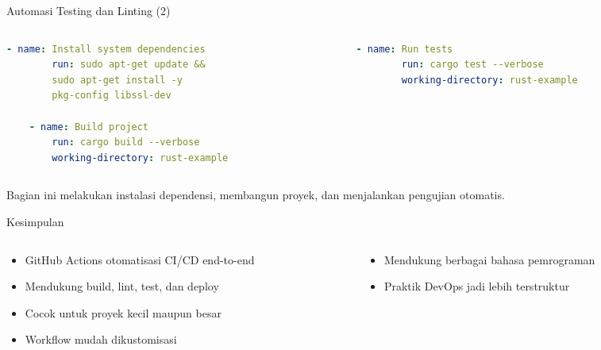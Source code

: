 \documentclass[aspectratio=169, table]{beamer}
\begin{document}
\begin{frame}[fragile]{Automasi Testing dan Linting (2)}
\vspace{10pt}
\begin{columns}[T]
\begin{column}{0.5\textwidth}
\begin{lstlisting}[language=yaml, firstnumber=21]
	- name: Install system dependencies
		run: sudo apt-get update &&
		sudo apt-get install -y
		pkg-config libssl-dev
	
	- name: Build project
		run: cargo build --verbose
		working-directory: rust-example
\end{lstlisting}
\end{column}

\begin{column}{0.5\textwidth}
\begin{lstlisting}[language=yaml, firstnumber=29]
	- name: Run tests
		run: cargo test --verbose
		working-directory: rust-example
\end{lstlisting}
\end{column}
\end{columns}

\vspace{6pt}
Bagian ini melakukan instalasi dependensi, membangun proyek, dan menjalankan pengujian otomatis.
\end{frame}

\begin{frame}[fragile]{Kesimpulan}
	\vspace{20pt}
	
	\begin{columns}[T]
		\begin{column}{0.5\textwidth}
			\begin{itemize}
				\item GitHub Actions otomatisasi CI/CD end-to-end
				\item Mendukung build, lint, test, dan deploy
				\item Cocok untuk proyek kecil maupun besar
				\item Workflow mudah dikustomisasi
			\end{itemize}
		\end{column}
		
		\begin{column}{0.5\textwidth}
			\begin{itemize}
				\item Mendukung berbagai bahasa pemrograman
				\item Praktik DevOps jadi lebih terstruktur
			\end{itemize}
		\end{column}
	\end{columns}
	
\end{frame}
\end{document}
